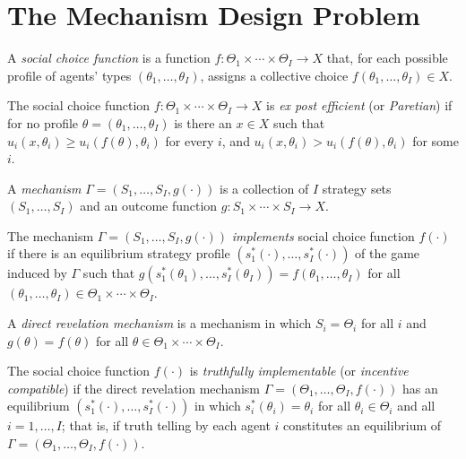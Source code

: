 \addtocounter{section}{1}


\section{The Mechanism Design Problem}

\begin{defn}
    A \emph{social choice function} is a function $f : \Theta_1 \times \cdots \times \Theta_I \to X$ that, for each possible profile of agents' types $(\theta_1, \dots, \theta_I)$, assigns a collective choice $f(\theta_1, \dots, \theta_I) \in X$.
\end{defn}

\begin{defn}
    The social choice function $f : \Theta_1 \times \cdots \times \Theta_I \to X$ is \emph{ex post efficient} (or \emph{Paretian}) if for no profile $\theta = (\theta_1, \dots, \theta_I)$ is there an $x \in X$ such that $u_i (x, \theta_i) \geq u_i (f(\theta), \theta_i)$ for every $i$, and $u_i (x, \theta_i) > u_i (f(\theta), \theta_i)$ for some $i$.
\end{defn}

\begin{defn}
    A \emph{mechanism} $\Gamma = (S_1, \dots, S_I, g(\cdot))$ is a collection of $I$ strategy sets $(S_1, \dots, S_I)$ and an outcome function $g : S_1 \times \cdots \times S_I \to X$.
\end{defn}

\begin{defn}
    The mechanism $\Gamma = (S_1, \dots, S_I, g(\cdot))$ \emph{implements} social choice function $f(\cdot)$ if there is an equilibrium strategy profile $(s_1^*(\cdot), \dots, s_I^*(\cdot))$ of the game induced by $\Gamma$ such that $g(s_1^*(\theta_1), \dots, s_I^*(\theta_I)) = f(\theta_1, \dots, \theta_I)$ for all $(\theta_1, \dots, \theta_I) \in \Theta_1 \times \cdots \times \Theta_I$.
\end{defn}

\begin{defn}
    A \emph{direct revelation mechanism} is a mechanism in which $S_i = \Theta_i$ for all $i$ and $g(\theta) = f(\theta)$ for all $\theta \in \Theta_1 \times \cdots \times \Theta_I$.
\end{defn}

\begin{defn}
    The social choice function $f(\cdot)$ is \emph{truthfully implementable} (or \emph{incentive compatible}) if the direct revelation mechanism $\Gamma = (\Theta_1, \dots, \Theta_I, f(\cdot))$ has an equilibrium $(s_1^*(\cdot), \dots, s_I^*(\cdot))$ in which $s_i^*(\theta_i) = \theta_i$ for all $\theta_i \in \Theta_i$ and all $i = 1, \dots, I$; that is, if truth telling by each agent $i$ constitutes an equilibrium of $\Gamma = (\Theta_1, \dots, \Theta_I, f(\cdot))$.
\end{defn}


